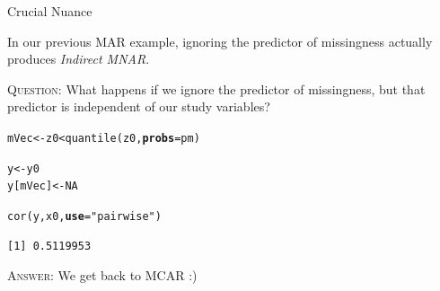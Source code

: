 \documentclass{beamer}\usepackage[]{graphicx}\usepackage[]{color}
\makeatletter
\newcommand{\hlnum}[1]{\textcolor[rgb]{0.69,0.494,0}{#1}}%
\newcommand{\hlstr}[1]{\textcolor[rgb]{0.749,0.012,0.012}{#1}}%
\newcommand{\hlopt}[1]{\textcolor[rgb]{0,0,0}{#1}}%
\newcommand{\hlstd}[1]{\textcolor[rgb]{0,0,0}{#1}}%
\newcommand{\hlkwb}[1]{\textcolor[rgb]{0,0.341,0.682}{#1}}%
\newcommand{\hlkwc}[1]{\textcolor[rgb]{0,0,0}{\textbf{#1}}}%
\newcommand{\hlkwd}[1]{\textcolor[rgb]{0.004,0.004,0.506}{#1}}%
\newenvironment{kframe}{%
 \def\at@end@of@kframe{}%
 \ifinner\ifhmode%
  \def\at@end@of@kframe{\end{minipage}}%
  \begin{minipage}{\columnwidth}%
 \fi\fi%
 \def\FrameCommand##1{\hskip\@totalleftmargin \hskip-\fboxsep
 \colorbox{shadecolor}{##1}\hskip-\fboxsep
     \hskip-\linewidth \hskip-\@totalleftmargin \hskip\columnwidth}%
 \MakeFramed {\advance\hsize-\width
   \@totalleftmargin\z@ \linewidth\hsize
   \@setminipage}}%
 {\par\unskip\endMakeFramed%
 \at@end@of@kframe}
\newenvironment{knitrout}{}{} %
\newcommand{\rmsc}[1]{\textrm{\textsc{#1}}}
\makeatother
\begin{document}

\begin{frame}[fragile]{Crucial Nuance}

  In our previous MAR example, ignoring the predictor of missingness actually
  produces \emph{Indirect MNAR}.\\

  \pause
  \va

  \rmsc{Question:} What happens if we ignore the predictor of missingness, but
  that predictor is independent of our study variables?

  \pause

\begin{knitrout}\footnotesize
{}\color{fgcolor}\begin{kframe}
\begin{alltt}
\hlstd{mVec} \hlkwb{<-} \hlstd{z0} \hlopt{<} \hlkwd{quantile}\hlstd{(z0,} \hlkwc{probs} \hlstd{= pm)}

\hlstd{y}       \hlkwb{<-} \hlstd{y0}
\hlstd{y[mVec]} \hlkwb{<-} \hlnum{NA}

\hlkwd{cor}\hlstd{(y, x0,} \hlkwc{use} \hlstd{=} \hlstr{"pairwise"}\hlstd{)}
\end{alltt}
\begin{verbatim}
[1] 0.5119953
\end{verbatim}
\end{kframe}
\end{knitrout}

\rmsc{Answer:} We get back to MCAR :)

\end{frame}

\end{document}
